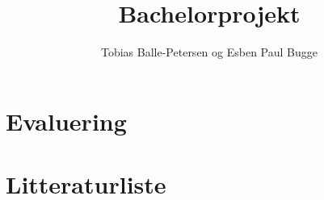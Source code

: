 \documentclass[12pt,a4paper,final]{report}
\author{Tobias Balle-Petersen og Esben Paul Bugge}
\title{Bachelorprojekt}
\begin{document}
\maketitle





\section{Evaluering}
\section{Litteraturliste}
\end{document}
